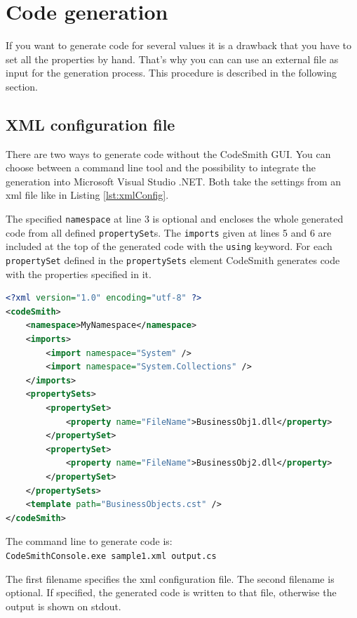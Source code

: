 \section{Code generation}
\label{sec:codeSmithGeneration}

If you want to generate code for several values it is a drawback that you have 
to set all the properties by hand. That's why you can can use an external file 
as input for the generation process. This procedure is described in the 
following section.


\subsection{XML configuration file}
There are two ways to generate code without the CodeSmith GUI. You can choose between 
a command line tool and the possibility to 
integrate the generation into Microsoft Visual Studio .NET. Both take 
the settings from an xml file like in Listing \ref{lst:xmlConfig}. 

The specified \verb~namespace~ at line 3 is optional and encloses the whole 
generated code from all defined \verb~propertySet~s.
The \verb~imports~ given at lines 5 and 6 are included at the top of the generated 
code with the \verb~using~ keyword.
For each \verb~propertySet~ defined in the \verb~propertySets~ element CodeSmith 
generates code with the properties specified in it.

\begin{lstlisting}[float,language=XML,caption=xml configuration,label=lst:xmlConfig]
<?xml version="1.0" encoding="utf-8" ?>
<codeSmith>
	<namespace>MyNamespace</namespace>
	<imports>
		<import namespace="System" />
		<import namespace="System.Collections" />
	</imports>
	<propertySets>
		<propertySet>
			<property name="FileName">BusinessObj1.dll</property>
		</propertySet>
		<propertySet>
			<property name="FileName">BusinessObj2.dll</property>
		</propertySet>
	</propertySets>
	<template path="BusinessObjects.cst" />
</codeSmith>
\end{lstlisting}

\noindent The command line to generate code is:\\
\indent \verb~CodeSmithConsole.exe sample1.xml output.cs~

\noindent The first filename specifies the xml configuration file. The second filename 
is optional. If specified, the generated code is written to that file, otherwise 
the output is shown on stdout. 

